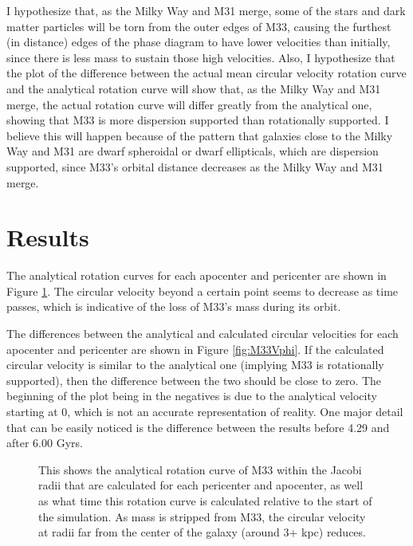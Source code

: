 \documentclass[trackchanges, twocolumn]{aastex7}
\begin{document}
I hypothesize that, as the Milky Way and M31 merge, some of the stars and dark matter particles will be torn from the outer edges of M33, causing the furthest (in distance) edges of the phase diagram to have lower velocities than initially, since there is less mass to sustain those high velocities. Also, I hypothesize that the plot of the difference between the actual mean circular velocity rotation curve and the analytical rotation curve will show that, as the Milky Way and M31 merge, the actual rotation curve will differ greatly from the analytical one, showing that M33 is more dispersion supported than rotationally supported. I believe this will happen because of the pattern that galaxies close to the Milky Way and M31 are dwarf spheroidal or dwarf ellipticals, which are dispersion supported, since M33's orbital distance decreases as the Milky Way and M31 merge.

\section{Results}

The analytical rotation curves for each apocenter and pericenter are shown in Figure \ref{fig:M33Rot}. The circular velocity beyond a certain point seems to decrease as time passes, which is indicative of the loss of M33's mass during its orbit.

The differences between the analytical and calculated circular velocities for each apocenter and pericenter are shown in Figure \ref{fig:M33Vphi}. If the calculated circular velocity is similar to the analytical one (implying M33 is rotationally supported), then the difference between the two should be close to zero. The beginning of the plot being in the negatives is due to the analytical velocity starting at 0, which is not an accurate representation of reality. One major detail that can be easily noticed is the difference  between the results before 4.29 and after 6.00 Gyrs.

\begin{figure}[ht!]
\caption{ This shows the analytical rotation curve of M33 within the Jacobi radii that are calculated for each pericenter and apocenter, as well as what time this rotation curve is calculated relative to the start of the simulation. As mass is stripped from M33, the circular velocity at radii far from the center of the galaxy (around 3+ kpc) reduces.
\label{fig:M33Rot}}
\end{figure}
\end{document}
